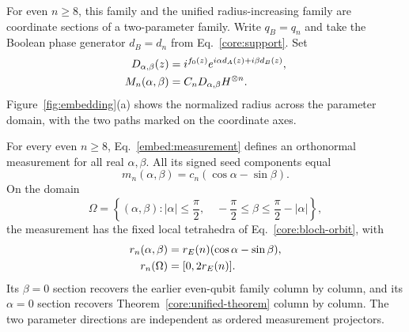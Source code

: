 For even $n\ge8$, this family and the unified radius-increasing family are coordinate sections of a two-parameter family. Write $q_B=q_n$ and take the Boolean phase generator $d_B=d_n$ from Eq.~\eqref{core:support}. Set
\begin{align}
 D_{\alpha,\beta}(z)&=i^{f_0(z)}e^{i\alpha d_A(z)+i\beta d_B(z)},\notag\\
 M_n(\alpha,\beta)&=C_nD_{\alpha,\beta}H^{\otimes n}.
 \label{embed:measurement}
\end{align}
Figure~\ref{fig:embedding}(a) shows the normalized radius across the parameter domain, with the two paths marked on the coordinate axes.

\begin{theorem}
\label{embed:theorem}
For every even $n\ge8$, Eq.~\eqref{embed:measurement} defines an orthonormal measurement for all real $\alpha,\beta$. All its signed seed components equal
\begin{equation}
 m_n(\alpha,\beta)=c_n(\cos\alpha-\sin\beta).
 \label{embed:component}
\end{equation}
On the domain
\begin{equation}
 \Omega=\left\{(\alpha,\beta): |\alpha|\le\frac\pi2,\quad
 -\frac\pi2\le\beta\le\frac\pi2-|\alpha|\right\},
 \label{embed:domain}
\end{equation}
the measurement has the fixed local tetrahedra of Eq.~\eqref{core:bloch-orbit}, with
\begin{align}
 r_n(\alpha,\beta)&=r_E(n)(\cos\alpha-\sin\beta),\notag\\
 r_n(\Omega)&=[0,2r_E(n)].
 \label{embed:radius}
\end{align}
Its $\beta=0$ section recovers the earlier even-qubit family column by column, and its $\alpha=0$ section recovers Theorem~\ref{core:unified-theorem} column by column. The two parameter directions are independent as ordered measurement projectors.
\end{theorem}


